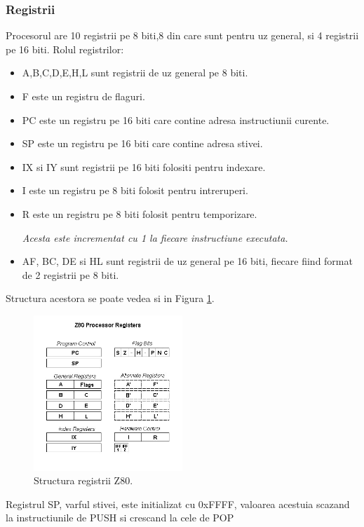 \documentclass[titlepage,12pt]{article}
\begin{document}
\subsubsection{Registrii}
\cite{ref:z80instructions}Procesorul are 10 registrii pe 8 biti,8 din care sunt pentru uz general, si 4 registrii pe 16 biti.
Rolul registrilor:
\begin{itemize}
\item A,B,C,D,E,H,L sunt registrii de uz general pe 8 biti.
\item F este un registru de flaguri.
\item PC este un registru pe 16 biti care contine adresa instructiunii curente.
\item SP este un registru pe 16 biti care contine adresa stivei.
\item IX si IY sunt registrii pe 16 biti folositi pentru indexare.
\item I este un registru pe 8 biti folosit pentru intreruperi.
\item R este un registru pe 8 biti folosit pentru temporizare.
\par \hspace{1em} \textit{Acesta este incrementat cu 1 la fiecare instructiune executata.}
\item AF, BC, DE si HL sunt registrii de uz general pe 16 biti, fiecare fiind format de 2 registrii pe 8 biti.
\end{itemize}
Structura acestora se poate vedea si in Figura \cref{fig:z80registers}.
\begin{figure}[H]
\centering
\includegraphics[width=0.5\textwidth]{images/z80registers.jpg}
\caption{Structura registrii Z80. \cite{ref:z80registers}}
\label{fig:z80registers}
\end{figure}

Registrul SP, varful stivei, este initializat cu 0xFFFF, valoarea acestuia scazand la instructiunile de PUSH si crescand la cele de POP
\end{document}
